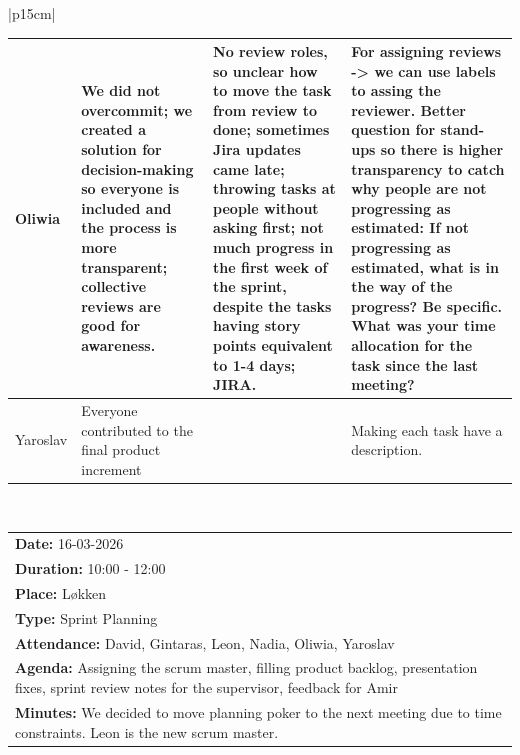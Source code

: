 \begin{table}[H]
    \centering
    \begin{tabular}{|p{15cm}|} 
        \hline
        \begin{table}[H]
            \begin{tabular}{|p{1.75cm}|p{4cm}|p{4cm}|p{4cm}|}
                \hline
                \cellcolor[HTML]{d4d4d4} Oliwia & We did not overcommit; we created a solution for decision-making so everyone is included and the process is more transparent; collective reviews are good for awareness. & No review roles, so unclear how to move the task from review to done; sometimes Jira updates came late; throwing tasks at people without asking first; not much progress in the first week of the sprint, despite the tasks having story points equivalent to 1-4 days; JIRA. & For assigning reviews -> we can use labels to assing the reviewer. Better question for stand-ups so there is higher transparency to catch why people are not progressing as estimated: If not progressing as estimated, what is in the way of the progress? Be specific. What was your time allocation for the task since the last meeting? \\
                \hline
                \cellcolor[HTML]{d4d4d4} Yaroslav & Everyone contributed to the final product increment &  & Making each task have a description. \\
                \hline
            \end{tabular}
        \end{table}
        \\
        \hline
    \end{tabular}
\end{table}

\begin{table}[H]
    \centering
    \begin{tabular}{|p{15cm}|}   
        \hline
        \textbf{Date:}  16-03-2026 \\
        \textbf{Duration:} 10:00 - 12:00 \\
        \textbf{Place:}  Løkken \\
        \textbf{Type:} Sprint Planning \\
        \textbf{Attendance:} David, Gintaras, Leon, Nadia, Oliwia, Yaroslav \\
        \textbf{Agenda:} Assigning the scrum master, filling product backlog, presentation fixes, sprint review notes for the supervisor, feedback for Amir\\
        \textbf{Minutes:} We decided to move planning poker to the next meeting due to time constraints. Leon is the new scrum master.  \\
        \hline
    \end{tabular}
\end{table}

